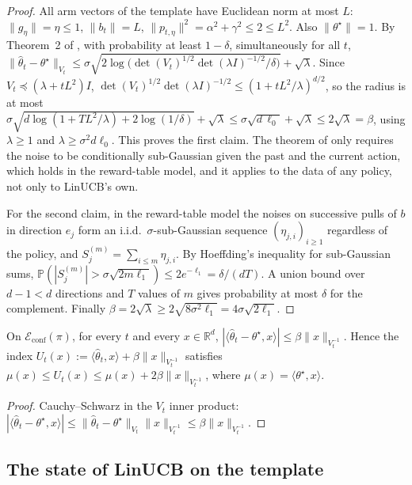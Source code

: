 \documentclass[anon]{alt2027} %
\newcommand{\R}{\mathbb{R}}
\newcommand{\Prb}{\mathbb{P}}
\begin{document}
\begin{proof}
All arm vectors of the template have Euclidean norm at most $L$: $\|g_\eta\|=\eta\le1$,
$\|b_t\|=L$, $\|p_{t,\eta}\|^2=\alpha^2+\gamma^2\le2\le L^2$. Also $\|\theta^\star\|=1$.
By Theorem~2 of \citet{abbasi2011improved}, with probability at least
$1-\delta$, simultaneously for all $t$,
$\|\widehat\theta_t-\theta^\star\|_{V_t}\le\sigma\sqrt{2\log\bigl(\det(V_t)^{1/2}\det(\lambda I)^{-1/2}/\delta\bigr)}+\sqrt\lambda$.
Since $V_t\preceq(\lambda+tL^2)I$, $\det(V_t)^{1/2}\det(\lambda I)^{-1/2}\le(1+tL^2/\lambda)^{d/2}$,
so the radius is at most
$\sigma\sqrt{d\log(1+TL^2/\lambda)+2\log(1/\delta)}+\sqrt\lambda\le\sigma\sqrt{d\,\ell_0}+\sqrt\lambda\le2\sqrt\lambda=\beta$,
using $\lambda\ge1$ and $\lambda\ge\sigma^2d\ell_0$. This proves the first claim.
The theorem of \citet{abbasi2011improved} only requires the noise to be
conditionally sub-Gaussian given the past and the current action, which holds
in the reward-table model, and it applies to the data of any policy, not only
to LinUCB's own.

For the second claim, in the reward-table model the noises on successive pulls
of $b$ in direction $e_j$ form an i.i.d.\ $\sigma$-sub-Gaussian sequence
$(\eta_{j,i})_{i\ge1}$ regardless of the policy, and $S_j^{(m)}=\sum_{i\le m}\eta_{j,i}$.
By Hoeffding's inequality for sub-Gaussian sums,
$\Prb(|S_j^{(m)}|>\sigma\sqrt{2m\ell_1})\le2e^{-\ell_1}=\delta/(dT)$. A union
bound over $d-1<d$ directions and $T$ values of $m$ gives probability at most
$\delta$ for the complement. Finally $\beta=2\sqrt\lambda\ge2\sqrt{8\sigma^2\ell_1}=4\sigma\sqrt{2\ell_1}$.
\end{proof}

\begin{lemma}
\label{lem:cat-conf}
On $\mathcal E_{\mathrm{conf}}(\pi)$, for every $t$ and every $x\in\R^d$,
$|\langle\widehat\theta_t-\theta^\star,x\rangle|\le\beta\|x\|_{V_t^{-1}}$.
Hence the index $U_t(x):=\langle\widehat\theta_t,x\rangle+\beta\|x\|_{V_t^{-1}}$
satisfies $\mu(x)\le U_t(x)\le\mu(x)+2\beta\|x\|_{V_t^{-1}}$, where
$\mu(x)=\langle\theta^\star,x\rangle$.
\end{lemma}

\begin{proof}
Cauchy--Schwarz in the $V_t$ inner product:
$|\langle\widehat\theta_t-\theta^\star,x\rangle|\le\|\widehat\theta_t-\theta^\star\|_{V_t}\|x\|_{V_t^{-1}}\le\beta\|x\|_{V_t^{-1}}$.
\end{proof}

\subsection{The state of LinUCB on the template}
\end{document}
